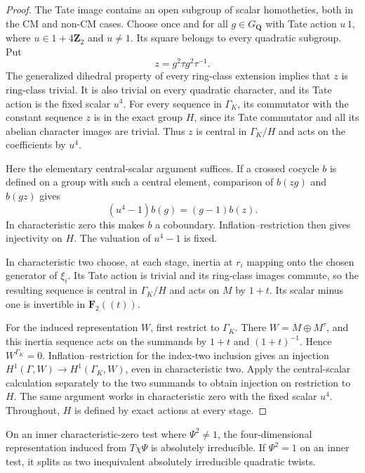 \begin{proof}
The Tate image contains an open subgroup of scalar homotheties, both
in the CM and non-CM cases.  Choose once and for all
$g\in G_{\mathbf Q}$ with Tate action $u\,1$, where
$u\in1+4\mathbf Z_2$ and $u\ne1$.  Its square belongs to every
quadratic subgroup.  Put
\[
 z=g^2\tau g^2\tau^{-1}.
\]
The generalized dihedral property of every ring-class extension
implies that $z$ is ring-class trivial.  It is also trivial on every
quadratic character, and its Tate action is the fixed scalar $u^4$.
For every sequence in $\Gamma_K$, its commutator with the constant
sequence $z$ is in the exact group $H$, since its Tate commutator and
all its abelian character images are trivial.  Thus $z$ is central in
$\Gamma_K/H$ and acts on the coefficients by $u^4$.

Here the elementary central-scalar argument suffices.  If a crossed
cocycle $b$ is defined on a group with such a central element, comparison
of $b(zg)$ and $b(gz)$ gives
\[
 (u^4-1)b(g)=(g-1)b(z).
\]
In characteristic zero this makes $b$ a coboundary.  Inflation--restriction
then gives injectivity on $H$.  The valuation of $u^4-1$ is fixed.

In characteristic two choose, at each stage, inertia at $r_i$ mapping
onto the chosen generator of $\xi_i$. Its Tate action is trivial and
its ring-class images commute, so the resulting sequence is central
in $\Gamma_K/H$ and acts on $M$ by $1+t$. Its scalar minus one is
invertible in $\mathbf F_2((t))$.

For the induced representation $W$, first restrict to $\Gamma_K$.
There $W=M\oplus M^\tau$, and this inertia sequence acts on the
summands by $1+t$ and $(1+t)^{-1}$. Hence $W^{\Gamma_K}=0$.
Inflation--restriction for the index-two inclusion gives an injection
$H^1(\Gamma,W)\to H^1(\Gamma_K,W)$, even in characteristic two.
Apply the central-scalar calculation separately to the two summands
to obtain injection on restriction to $H$. The same argument works
in characteristic zero with the fixed scalar $u^4$.
Throughout, $H$ is defined by exact actions at every stage.
\end{proof}

\begin{lemma}
\label{rl:irreducibility}
On an inner characteristic-zero test where $\Psi^2\ne1$,
the four-dimensional representation induced from $T\chi\Psi$ is
absolutely irreducible.  If $\Psi^2=1$ on an inner test, it splits
as two inequivalent absolutely irreducible quadratic twists.
\end{lemma}

